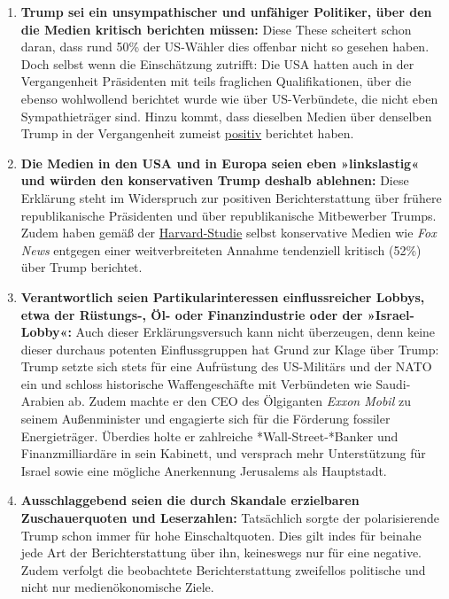 \begin{enumerate}
\def\labelenumi{\arabic{enumi}.}
\tightlist
\item
  \textbf{Trump sei ein unsympathischer und unfähiger Politiker, über
  den die Medien kritisch berichten müssen:} Diese These scheitert schon
  daran, dass rund 50\% der US-Wähler dies offenbar nicht so gesehen
  haben. Doch selbst wenn die Einschätzung zutrifft: Die USA hatten auch
  in der Vergangenheit Präsidenten mit teils fraglichen Qualifikationen,
  über die ebenso wohlwollend berichtet wurde wie über US-Verbündete,
  die nicht eben Sympathieträger sind. Hinzu kommt, dass dieselben
  Medien über denselben Trump in der Vergangenheit zumeist
  \href{https://www.youtube.com/watch?v=SEPs17_AkTI}{positiv} berichtet
  haben.
\item
  \textbf{Die Medien in den USA und in Europa seien eben »linkslastig«
  und würden den konservativen Trump deshalb ablehnen:} Diese Erklärung
  steht im Widerspruch zur positiven Berichterstattung über frühere
  republikanische Präsidenten und über republikanische Mitbewerber
  Trumps. Zudem haben gemäß der
  \href{http://meedia.de/2017/05/23/harvard-studie-keiner-berichtete-negativer-ueber-donald-trump-als-die-ard/}{Harvard-Studie}
  selbst konservative Medien wie \emph{Fox News} entgegen einer
  weitverbreiteten Annahme tendenziell kritisch (52\%) über Trump
  berichtet.
\item
  \textbf{Verantwortlich seien Partikularinteressen einflussreicher
  Lobbys, etwa der Rüstungs-, Öl- oder Finanzindustrie oder der
  »Israel-Lobby«:} Auch dieser Erklärungsversuch kann nicht überzeugen,
  denn keine dieser durchaus potenten Einflussgruppen hat Grund zur
  Klage über Trump: Trump setzte sich stets für eine Aufrüstung des
  US-Militärs und der NATO ein und schloss historische Waffengeschäfte
  mit Verbündeten wie Saudi-Arabien ab. Zudem machte er den CEO des
  Ölgiganten \emph{Exxon Mobil} zu seinem Außenminister und engagierte
  sich für die Förderung fossiler Energieträger. Überdies holte er
  zahlreiche *Wall-Street-*Banker und Finanzmilliardäre in sein
  Kabinett, und versprach mehr Unterstützung für Israel sowie eine
  mögliche Anerkennung Jerusalems als Hauptstadt.
\item
  \textbf{Ausschlaggebend seien die durch Skandale erzielbaren
  Zuschauerquoten und Leserzahlen:} Tatsächlich sorgte der
  polarisierende Trump schon immer für hohe Einschaltquoten. Dies gilt
  indes für beinahe jede Art der Berichterstattung über ihn, keineswegs
  nur für eine negative. Zudem verfolgt die beobachtete
  Berichterstattung zweifellos politische und nicht nur
  medienökonomische Ziele.
\end{enumerate}

